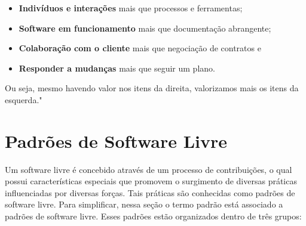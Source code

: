 \begin{itemize}
\item \textbf{Indivíduos e interações} mais que processos e ferramentas;
\item \textbf{Software em funcionamento} mais que documentação abrangente;
\item \textbf{Colaboração com o cliente} mais que negociação de contratos e
\item \textbf{Responder a mudanças} mais que seguir um plano.
\end{itemize}

Ou seja, mesmo havendo valor nos itens da direita, valorizamos mais os itens da esquerda."


\section{Padrões de Software Livre}

Um software livre é concebido através de um processo de contribuições, o qual possui características especiais que promovem o surgimento de diversas práticas influenciadas por diversas forças. Tais práticas são conhecidas como padrões de software livre. Para simplificar, nessa seção o termo padrão está associado a padrões de software livre. Esses padrões estão organizados dentro de três grupos:

